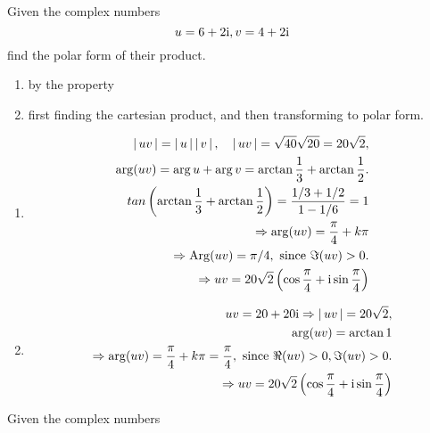 \documentclass[11pt]{amsbook}
\begin{document}
%
\begin{exmp}
	Given the complex numbers	
	\[
		u = 6 + 2 \mathrm{i},  v = 4 + 2 \mathrm{i}
	\]
	find the polar form of their product.
	
	\begin{enumerate}[label=(\alph*)]
		
		\item 
		by the property 
		
		\item 
		first finding the cartesian product, and 
		then transforming to polar form.
	\end{enumerate}
	\begin{hSolution}
		\begin{enumerate}[label=(\alph*)]
			
			\item 
			\begin{align*}
				\left \lvert \, uv \, \right \rvert 
					= \left \lvert \, u \, \right \rvert\left \lvert \, v \, \right \rvert,
				\quad 
				\left \lvert \, uv \, \right \rvert 
					= \sqrt{40} \sqrt{20} 
					= 20\sqrt{2},\\
				\arg (uv) = \arg u + \arg v 
					= \arctan \frac{1}{3} + \arctan \frac{1}{2}.\\
				 tan \left( \arctan \frac{1}{3} + \arctan \frac{1}{2} \right) 
					 = \frac{1/3 + 1/2}{1 - 1/6} 
					 = 1\\
				 \Rightarrow \arg (uv) = \frac{\pi}{4} +  k \pi\\
				 \Rightarrow \mathrm{Arg} (uv) = \pi / 4, \text{ since } \Im (uv) > 0.\\
				 \Rightarrow uv = 20 \sqrt{2} 
				 	\left( \cos \frac{\pi}{4} + \mathrm{i} \sin \frac{\pi}{4} \right)
			\end{align*}
			
			\item 
			\begin{align*}
				uv = 20 + 20 \mathrm{i} 
					\Rightarrow  \left \lvert \, uv \, \right \rvert = 20\sqrt{2},\\
				\arg (uv) = \arctan 1\\
				\Rightarrow 
					\arg (uv) 
					= \frac{\pi}{4} + k\pi 
					= \frac{\pi}{4}, 
				\text{ since } 
				\Re (uv) > 0, 
				\Im (uv) > 0.\\
				\Rightarrow 
					uv = 
					20 \sqrt{2} \left( \cos \frac{\pi}{4} 
					+ \mathrm{i} \sin \frac{\pi}{4} \right)
			\end{align*}
		\end{enumerate}
	\end{hSolution}
\end{exmp}
%
\begin{exmp}
	Given the complex numbers	
\end{exmp}
\end{document}
